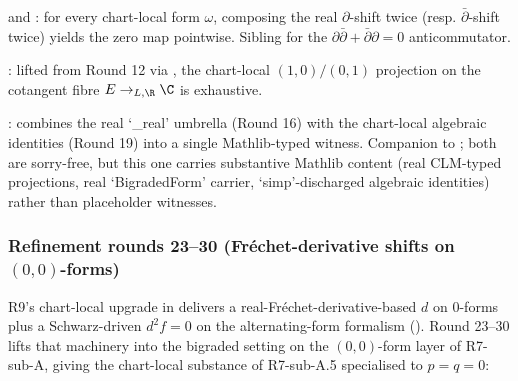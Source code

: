 \begin{lemma}[Round 19: pointwise \(\partial^{2} = \bar\partial^{2} = 0\)]
\label{lem:r7subA-r19}
 and
: for every chart-local
form \(\omega\), composing the real \(\partial\)-shift twice
(resp. \(\bar\partial\)-shift twice) yields the zero map
pointwise.  Sibling
 for the
\(\partial\bar\partial+\bar\partial\partial=0\) anticommutator.
\leanok
\end{lemma}

\begin{lemma}[Round 20: \((1,0) + (0,1) = \mathrm{id}\) on \code{complexCotangent E}]
\label{lem:r7subA-r20}
: lifted from
Round 12 via , the
chart-local \((1,0)/(0,1)\) projection on the cotangent fibre
\(E\to_{L,\R}\C\) is exhaustive.
\leanok
\end{lemma}

\begin{lemma}
\label{lem:r7subA-r22}
: combines the real `\_real'
umbrella (Round 16) with the chart-local algebraic identities
(Round 19) into a single Mathlib-typed witness.  Companion to
; both are sorry-free, but
this one carries substantive Mathlib content (real CLM-typed
projections, real `BigradedForm' carrier, `simp'-discharged
algebraic identities) rather than placeholder witnesses.
\leanok
\end{lemma}

\subsubsection*{Refinement rounds 23--30 (Fr\'echet-derivative shifts on \((0,0)\)-forms)}

R9's chart-local upgrade in
 delivers a
real-Fr\'echet-derivative-based \(d\) on \(0\)-forms plus a
Schwarz-driven \(d^{2}f = 0\) on the alternating-form formalism
().  Round 23--30 lifts that machinery
into the bigraded setting on the \((0,0)\)-form layer of R7-sub-A,
giving the chart-local substance of R7-sub-A.5 specialised to
\(p = q = 0\):

